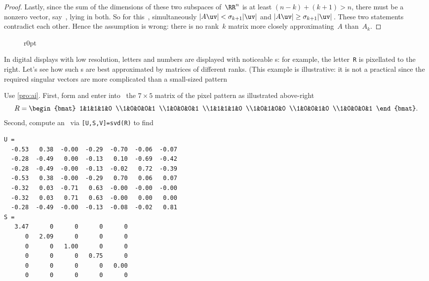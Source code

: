 \begin{proof}
Lastly, since the sum of the dimensions of these two subspaces of~\(\RR^n\) is at least \((n-k)+(k+1)>n\), there must be a nonzero vector, say~\uv, lying in both.
So for this~\uv, simultaneously \(|A\uv|<\sigma_{k+1}|\uv|\) and \(|A\uv|\geq\sigma_{k+1}|\uv|\)\,.
These two statements contradict each other.
Hence the assumption is wrong: there is no rank~\(k\) matrix more closely approximating~\(A\) than~\(A_k\).
\end{proof}

\begin{figure}r{0pt}  \end{figure}
\begin{example} 
In digital displays with low resolution, letters and numbers are displayed with noticeable s: for example, the letter~\verb|R| is pixellated to the right.
Let's see how such s are best approximated by matrices of different ranks.
(This example is illustrative: it is not a practical  since the required singular vectors are more complicated than a small-sized pattern 
\begin{solution} 
Use \cref{pro:ai}.
First, form and enter into \script\ the \(7\times5\) matrix of the pixel pattern as illustrated above-right
\begin{equation*}
R=\begin{bmat} 1&1&1&1&0
\\1&0&0&0&1
\\1&0&0&0&1
\\1&1&1&1&0
\\1&0&1&0&0
\\1&0&0&1&0
\\1&0&0&0&1 \end{bmat}.
\end{equation*}
Second, compute an \svd\ via \verb|[U,S,V]=svd(R)| to find \twodp
\begin{verbatim}
U =
  -0.53   0.38  -0.00  -0.29  -0.70  -0.06  -0.07
  -0.28  -0.49   0.00  -0.13   0.10  -0.69  -0.42
  -0.28  -0.49  -0.00  -0.13  -0.02   0.72  -0.39
  -0.53   0.38  -0.00  -0.29   0.70   0.06   0.07
  -0.32   0.03  -0.71   0.63  -0.00  -0.00  -0.00
  -0.32   0.03   0.71   0.63  -0.00   0.00   0.00
  -0.28  -0.49  -0.00  -0.13  -0.08  -0.02   0.81
S =
   3.47      0      0      0      0
      0   2.09      0      0      0
      0      0   1.00      0      0
      0      0      0   0.75      0
      0      0      0      0   0.00
      0      0      0      0      0

\end{verbatim}
\end{solution}
\end{example}
